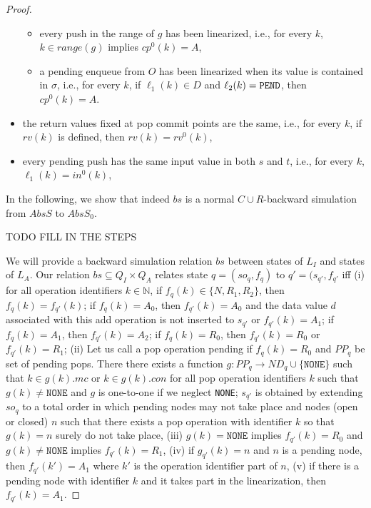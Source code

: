 \begin{proof}
\begin{itemize}
\begin{itemize}
		\item every push in the range of $g$ has been linearized, i.e., for every $k$, $k\in range(g)$ implies $cp^0(k)=A$,
		\item a pending enqueue from $O$ has been linearized when its value is contained in $\sigma$, i.e., for every $k$, if $\ell_1(k)\in D$ and $\ell_2(k)={\tt PEND}$, then $cp^0(k)=A$.
	\end{itemize}
	\item the return values fixed at pop commit points are the same, i.e., for every $k$, if $rv(k)$ is defined, then $rv(k)=rv^0(k)$,
	\item every pending push has the same input value in both $s$ and $t$, i.e., for every $k$, $\ell_1(k)=in^0(k)$,
\end{itemize}

In the following, we show that indeed $bs$ is a normal $C\cup R$-backward simulation from $AbsS$ to $AbsS_0$.

TODO FILL IN THE STEPS


We will provide a backward simulation relation $bs$ between states of $L_I$ and states of $L_A$. Our relation $bs \subseteq Q_I \times Q_A$ relates state $q=(so_q, f_q)$ to $q' =(s_{q'}, f_{q'}$ iff (i) for all operation identifiers $k \in \mathbb{N}$, if $f_q(k) \in \{N,R_1,R_2\}$, then $f_q(k) = f_{q'}(k)$; if $f_q(k) = A_0$, then $f_{q'}(k) = A_0$ and the data value $d$ associated with this add operation is not inserted to $s_{q'}$ or $f_{q'}(k) = A_1$;  if $f_q(k) = A_1$, then $f_{q'}(k) = A_2$; if $f_q(k) = R_0$, then $f_{q'}(k)=R_0$ or $f_{q'}(k)=R_1$; (ii) Let us call a pop operation pending if $f_{q}(k) = R_0$ and $PP_q$ be set of pending pops. There there exists a function $g: PP_q \rightarrow ND_q \cup \{\texttt{NONE}\}$ such that $k \in g(k).mc$ or $k \in g(k).con$ for all pop operation identifiers $k$ such that $g(k) \neq \texttt{NONE}$ and $g$ is one-to-one if we neglect \texttt{NONE}; $s_{q'}$ is obtained by extending $so_q$ to a total order in which pending nodes may not take place and nodes (open or closed) $n$ such that there exists a pop operation with identifier $k$ so that $g(k)=n$ surely do not take place, (iii) $g(k) = \texttt{NONE}$ implies $f_{q'}(k) = R_0$ and $g(k) \neq \texttt{NONE}$ implies $f_{q'}(k) =R_1$, (iv) if $g_{q'}(k) =n$ and $n$ is a pending node, then $f_{q'}(k') = A_1$ where $k'$ is the operation identifier part of $n$, (v) if there is a pending node with identifier $k$ and it takes part in the linearization, then $f_{q'}(k) = A_1$. 


\end{proof}
